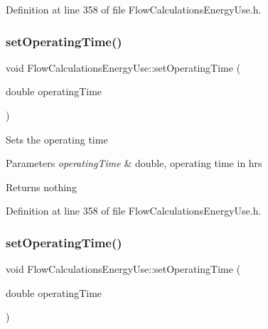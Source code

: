 Definition at line 358 of file Flow\+Calculations\+Energy\+Use.\+h.

\mbox{\label{class_flow_calculations_energy_use_ac82800d533502c7836238dcab1f39fac}} 
\subsubsection{\texorpdfstring{set\+Operating\+Time()}{setOperatingTime()}\hspace{0.1cm}{\footnotesize\ttfamily [2/3]}}
{\footnotesize\ttfamily void Flow\+Calculations\+Energy\+Use\+::set\+Operating\+Time (\begin{DoxyParamCaption}\item[{double}]{operating\+Time }\end{DoxyParamCaption})\hspace{0.3cm}{\ttfamily [inline]}}

Sets the operating time


\begin{DoxyParams}{Parameters}
{\em operating\+Time} & double, operating time in hrs\\
\hline
\end{DoxyParams}
\begin{DoxyReturn}{Returns}
nothing 
\end{DoxyReturn}


Definition at line 358 of file Flow\+Calculations\+Energy\+Use.\+h.

\mbox{\label{class_flow_calculations_energy_use_ac82800d533502c7836238dcab1f39fac}} 
\subsubsection{\texorpdfstring{set\+Operating\+Time()}{setOperatingTime()}\hspace{0.1cm}{\footnotesize\ttfamily [3/3]}}
{\footnotesize\ttfamily void Flow\+Calculations\+Energy\+Use\+::set\+Operating\+Time (\begin{DoxyParamCaption}\item[{double}]{operating\+Time }\end{DoxyParamCaption})\hspace{0.3cm}{\ttfamily [inline]}}

